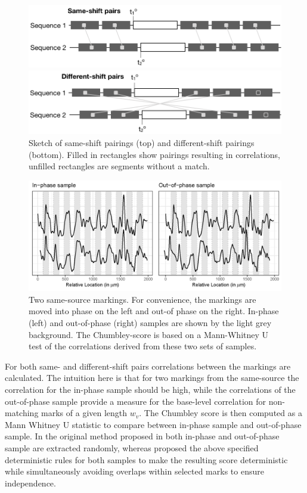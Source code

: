 \documentclass[12pt]{article}
\begin{document}
\begin{figure}[hbtp]
\centering
\includegraphics[width=.7\textwidth]{images/sketch-same.png}

\includegraphics[width=.7\textwidth]{images/sketch-diff.png}
\caption{\label{sketch-same-diff}Sketch of same-shift pairings  (top) and different-shift pairings (bottom). Filled in rectangles show pairings resulting in correlations, unfilled rectangles are segments without a match.}
\end{figure}

\begin{figure}

{\centering \includegraphics[width=\textwidth]{figures/win-comparison-1} 

}

\caption{Two same-source markings. For convenience, the markings are moved into phase on the left and out-of phase on the right. In-phase (left) and out-of-phase (right) samples are shown by the light grey background. The Chumbley-score is based on a Mann-Whitney U test of the correlations derived from these two sets of samples.}\label{fig:win-comparison}
\end{figure}

For both same- and different-shift pairs correlations between the
markings are calculated. The intuition here is that for two markings
from the same-source the correlation for the in-phase sample should be
high, while the correlations of the out-of-phase sample provide a
measure for the base-level correlation for non-matching marks of a given
length \(w_v\). The Chumbley score is then computed as a Mann Whitney U
statistic to compare between in-phase sample and out-of-phase sample. In
the original method proposed in \citet{chumbley} both in-phase and
out-of-phase sample are extracted randomly, whereas \citet{hadler}
proposed the above specified deterministic rules for both samples to
make the resulting score deterministic while simultaneously avoiding
overlaps within selected marks to ensure independence.
\end{document}
